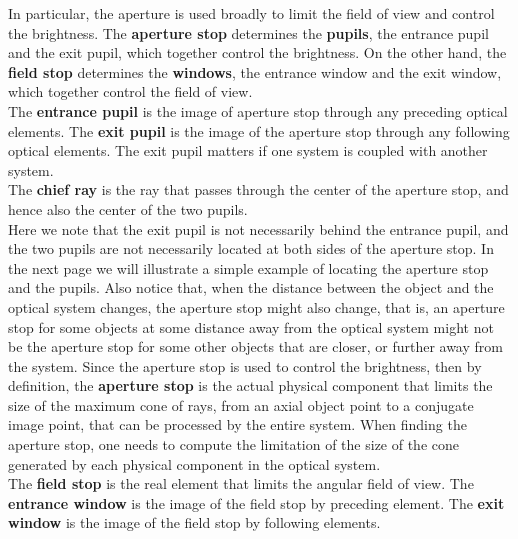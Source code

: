 \documentclass[11pt]{book}
\theoremstyle{break}
\theoremstyle{break}
\begin{document}
In particular, the aperture is used broadly to limit the field of view and control the brightness. The \textbf{aperture stop} determines the \textbf{pupils}, the entrance pupil and the exit pupil, which together control the brightness. On the other hand, the \textbf{field stop} determines the \textbf{windows}, the entrance window and the exit window, which together control the field of view.\\

The \textbf{entrance pupil} is the image of aperture stop through any preceding optical elements. The \textbf{exit pupil} is the image of the aperture stop through any following optical elements. The exit pupil matters if one system is coupled with another system.\\

The \textbf{chief ray} is the ray that passes through the center of the aperture stop, and hence also the center of the two pupils. \\

Here we note that the exit pupil is not necessarily behind the entrance pupil, and the two pupils are not necessarily located at both sides of the aperture stop. In the next page we will illustrate a simple example of locating the aperture stop and the pupils. Also notice that, when the distance between the object and the optical system changes, the aperture stop might also change, that is, an aperture stop for some objects at some distance away from the optical system might not be the aperture stop for some other objects that are closer, or further away from the system. Since the aperture stop is used to control the brightness, then by definition, the \textbf{aperture stop} is the actual physical component that limits the size of the maximum cone of rays, from an axial object point to a conjugate image point, that can be processed by the entire system. When finding the aperture stop, one needs to compute the limitation of the size of the cone generated by each physical component in the optical system. \\

The \textbf{field stop} is the real element that limits the angular field of view. The \textbf{entrance window} is the image of the field stop by preceding element. The \textbf{exit window} is the image of the field stop by following elements.  
\end{document}
